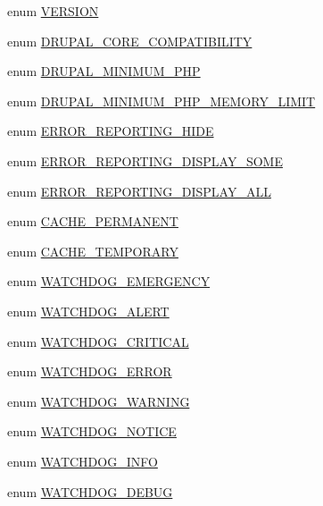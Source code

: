 \begin{DoxyCompactItemize}
\item 
enum \hyperlink{bootstrap_8inc_ae48ea820d6b3acc7353b763034c772af}{VERSION} 
\item 
enum \hyperlink{bootstrap_8inc_a4f0dd177a6291b9d7fc1b5ae033b5eaf}{DRUPAL\_\-CORE\_\-COMPATIBILITY} 
\item 
enum \hyperlink{bootstrap_8inc_a370c52d1679da96064df124c55f16ea8}{DRUPAL\_\-MINIMUM\_\-PHP} 
\item 
enum \hyperlink{bootstrap_8inc_a996d6c835e5fee7728aed6a4dfc6a6aa}{DRUPAL\_\-MINIMUM\_\-PHP\_\-MEMORY\_\-LIMIT} 
\item 
enum \hyperlink{bootstrap_8inc_a51db8c6c6fe8ff2e55190c0422fd042b}{ERROR\_\-REPORTING\_\-HIDE} 
\item 
enum \hyperlink{bootstrap_8inc_a566b6dd0064dc70e81cb192a978bb3fc}{ERROR\_\-REPORTING\_\-DISPLAY\_\-SOME} 
\item 
enum \hyperlink{bootstrap_8inc_af3c9cac6c517f03e57d03ac5e0c7efb2}{ERROR\_\-REPORTING\_\-DISPLAY\_\-ALL} 
\item 
enum \hyperlink{bootstrap_8inc_ad987330fff5fa7c75800762ddedf300c}{CACHE\_\-PERMANENT} 
\item 
enum \hyperlink{bootstrap_8inc_a1f2558e91eb9f33d14168bb8dfd99690}{CACHE\_\-TEMPORARY} 
\item 
enum \hyperlink{group__logging__severity__levels_ga467e941228edf3b033b5ef460e1bfcf7}{WATCHDOG\_\-EMERGENCY} 
\item 
enum \hyperlink{group__logging__severity__levels_ga9fdd40d55b14109f09f091f401f237c0}{WATCHDOG\_\-ALERT} 
\item 
enum \hyperlink{group__logging__severity__levels_gab4129b98c8480bea3cbcd62083ae81e3}{WATCHDOG\_\-CRITICAL} 
\item 
enum \hyperlink{group__logging__severity__levels_ga174c9df2936096e11986fcf184d48576}{WATCHDOG\_\-ERROR} 
\item 
enum \hyperlink{group__logging__severity__levels_ga5361f835e10b39b553ee73c1b9414bf1}{WATCHDOG\_\-WARNING} 
\item 
enum \hyperlink{group__logging__severity__levels_ga757a33416683e8c44636a8799f60b477}{WATCHDOG\_\-NOTICE} 
\item 
enum \hyperlink{group__logging__severity__levels_ga9629ff808fd20ce4abb297db5976af4d}{WATCHDOG\_\-INFO} 
\item 
enum \hyperlink{group__logging__severity__levels_gaf672cd38d5654f8a4a12e32d9b9e749d}{WATCHDOG\_\-DEBUG} 
\item 

\end{DoxyCompactItemize}
